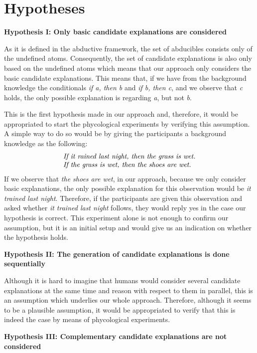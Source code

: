 \section{Hypotheses}

\textbf{Hypothesis I: Only basic candidate explanations are considered}

As it is defined in the abductive framework, the set of abducibles consists only of the undefined atoms. Consequently, the set of candidate explanations is also only based on the undefined atoms which means that our approach only considers the basic candidate explanations. This means that, if we have from the background knowledge the conditionals \textit{if a, then b} and \textit{if b, then c}, and we observe that \textit{c} holds, the only possible explanation is regarding \textit{a}, but not \textit{b}.

This is  the first hypothesis made in our approach and, therefore, it would be appropriated to start the phycological experiments by verifying this assumption. A simple way to do so would be by giving the participants a background knowledge as the following:
\[
\begin{array}{l}
\mbox{\textit{If it rained last night, then the grass is wet.}}\\
\mbox{\textit{If the grass is wet, then the shoes are wet.}}\\
\end{array}
\]
If we observe that \textit{the shoes are wet}, in our approach, because we only consider basic explanations, the only possible explanation for this observation would be \textit{it trained last night}. Therefore, if the participants are given this observation and asked whether \textit{it trained last night} follows, they would reply yes in the case our hypothesis is correct. This experiment alone is not enough to confirm our assumption, but it is an initial setup and would give us an indication on whether the hypothesis holds.


\textbf{Hypothesis II: The generation of candidate explanations is done sequentially}

Although it is hard to imagine that humans would consider several candidate explanations at the same time and reason with respect to them in parallel, this is an assumption which underlies our whole approach. Therefore, although it seems to be a plausible assumption, it would be appropriated to verify that this is indeed the case by means of phycological experiments.

\textbf{Hypothesis III: Complementary candidate explanations are not considered}

